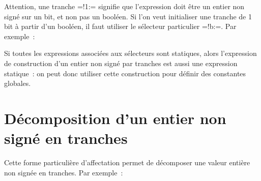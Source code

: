 Attention, une tranche \plm=!1:= signifie que l'expression doit être un entier non signé sur un bit, et non pas un booléen. Si l'on veut initialiser une tranche de 1 bit à partir d'un booléen, il faut utiliser le sélecteur particulier \plm=!b:=. Par exemple~:

Si toutes les expressions associées aux sélecteurs sont statiques, alors l'expression de construction d'un entier non signé par tranches est aussi une expression statique~: on peut donc utiliser cette construction pour définir des constantes globales.





\section{Décomposition d'un entier non signé en tranches}

Cette forme particulière d'affectation permet de décomposer une valeur entière non signée en tranches. Par exemple~:


